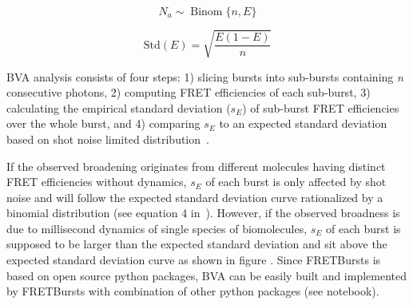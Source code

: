 \begin{equation}
\label{eq:binom_dist}
N_a \sim \operatorname{Binom} \{n, E\}
\end{equation}

\begin{equation}
\label{eq:binom_std}
\operatorname{Std(\textit{E})} = {\sqrt{\frac{E(1 - E)}{n}}}
\end{equation}


BVA analysis consists of four steps: 1) slicing bursts into sub-bursts containing \textit{n} consecutive photons, 2) computing FRET efficiencies of each sub-burst, 3) calculating the empirical standard deviation ($s_E$) of sub-burst FRET efficiencies over the whole burst, and 4) comparing $s_E$ to an expected standard deviation based on shot noise limited distribution~\cite{Torella_2011}. 

If the observed broadening originates from different molecules having distinct FRET efficiencies without dynamics, $s_E$ of each burst is only affected by shot noise and will follow the expected standard deviation curve rationalized by a binomial distribution (see equation 4 in~\cite{Torella_2011}). However, if the observed broadness is due to millisecond dynamics of single species of biomolecules, $s_E$ of each burst is supposed to be larger than the expected standard deviation and sit above the expected standard deviation curve as shown in figure .
Since FRETBursts is based on open source python packages, BVA can be easily built and implemented by FRETBursts with combination of other python packages (see notebook).  
